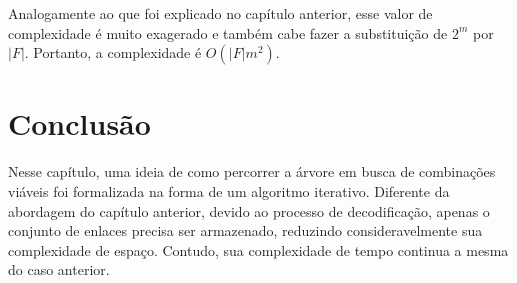 Analogamente ao que foi explicado no capítulo anterior, esse valor de complexidade é muito exagerado e também cabe fazer a substituição de $2^m$ por $|F|$. Portanto, a complexidade é $O(|F|m^2)$.

\section{Conclusão}

Nesse capítulo, uma ideia de como percorrer a árvore em busca de combinações viáveis foi formalizada na forma de um algoritmo iterativo. Diferente da abordagem do capítulo anterior, devido ao processo de decodificação, apenas o conjunto de enlaces precisa ser armazenado, reduzindo consideravelmente sua complexidade de espaço. Contudo, sua complexidade de tempo continua a mesma do caso anterior.
